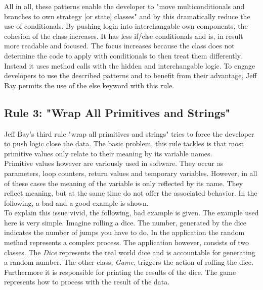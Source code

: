  All in all, these patterns enable the developer to "move multiconditionals and branches to own strategy [or state] classes" \cite{gof} and by this dramatically reduce the use of conditionals. By pushing login into interchangable own components, the cohesion of the class increases. It has less if/else conditionals and is, in result more readable and focused. The focus increases because the class does not determine the code to apply with conditionals to then treat them differently. Instead it uses method calls with the hidden and interchangable logic. To engage developers to use the described patterns and to benefit from their advantage, Jeff Bay permits the use of the else keyword with this rule. 

\subsection*{Rule 3: "Wrap All Primitives and Strings"}
Jeff Bay's third rule "wrap all primitives and strings" tries to force the developer to push logic close the data. The basic problem, this rule tackles is that most primitive values only relate to their meaning by its variable names. 
\\

Primitive values however are variously used in software. They occur as parameters, loop counters, return values and temporary variables. However, in all of these cases the meaning of the variable is only reflected by its name. They reflect meaning, but at the same time do not offer the associated behavior. In the following, a bad and a good example is shown. 
\\

To explain this issue vivid, the following, bad example is given. The example used here is very simple. Imagine rolling a dice. The number, generated by the dice indicates the number of jumps you have to do. In the application the random method represents a complex process. The application however, consists of two classes. The \textit{Dice} represents the real world dice and is accountable for generating a random number. The other class, \textit{Game}, triggers the action of rolling the dice. Furthermore it is responsible for printing the results of the dice. The game represents how to process with the result of the data.   
\\

